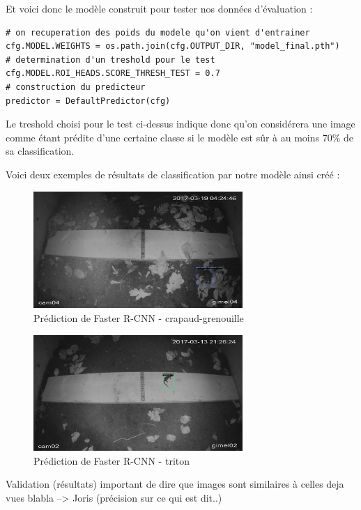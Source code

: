 Et voici donc le modèle construit pour tester nos données d'évaluation : 

\lstset{language=Python}
\begin{lstlisting}
# on recuperation des poids du modele qu'on vient d'entrainer
cfg.MODEL.WEIGHTS = os.path.join(cfg.OUTPUT_DIR, "model_final.pth")  
# determination d'un treshold pour le test
cfg.MODEL.ROI_HEADS.SCORE_THRESH_TEST = 0.7  
# construction du predicteur
predictor = DefaultPredictor(cfg)
\end{lstlisting}

Le treshold choisi pour le test ci-dessus indique donc qu'on considérera une image comme étant prédite d'une certaine classe si le modèle est sûr à au moins 70\% de sa classification.\newline

Voici deux exemples de résultats de classification par notre modèle ainsi créé :

\begin{figure}[H]
    \centering
    \includegraphics[width=300px]{images/Eval_FasterRCNN_crapGren.png}
    \caption{Prédiction de Faster R-CNN - crapaud-grenouille}
    \label{fig:fasterRcnn_crapGren}
\end{figure}

\begin{figure}[H]
    \centering
    \includegraphics[width=300px]{images/Eval_FasterRCNN_triton.png}
    \caption{Prédiction de Faster R-CNN - triton}
    \label{fig:fasterRcnn_triton}
\end{figure}

Validation (résultats) important de dire que images sont similaires à celles deja vues blabla --> Joris (précision sur ce qui est dit..)

